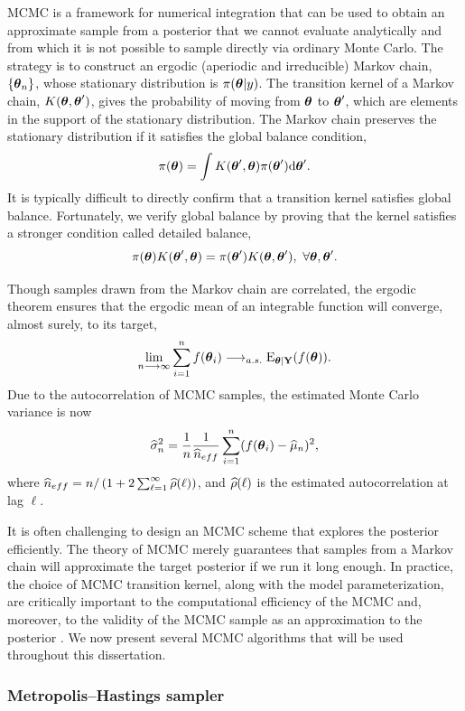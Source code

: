 MCMC is a framework for numerical integration that can be used to obtain an approximate sample from a posterior that we cannot evaluate analytically and from which it is not possible to sample directly via ordinary Monte Carlo. The strategy is to construct an ergodic (aperiodic and irreducible) Markov chain, $ \lbrace \boldsymbol{\theta}_n\rbrace $, whose stationary distribution is $ \pi(\boldsymbol{\theta}|y) $. The transition kernel of a Markov chain, $ K(\boldsymbol{\theta},\boldsymbol{\theta}^\prime) $, gives the probability of moving from $ \boldsymbol{\theta} $ to $ \boldsymbol{\theta}^\prime $, which are elements in the support of the stationary distribution. The Markov chain preserves the stationary distribution if it satisfies the global balance condition,
$$\pi(\boldsymbol{\theta}) = \int K(\boldsymbol{\theta}^\prime,\boldsymbol{\theta})\pi(\boldsymbol{\theta}^\prime)\mathrm{d} \boldsymbol{\theta}^\prime.$$
It is typically difficult to directly confirm that a transition kernel satisfies global balance. Fortunately, we verify global balance by proving that the kernel satisfies a stronger condition called detailed balance,
$$\pi(\boldsymbol{\theta})K(\boldsymbol{\theta}^\prime,\boldsymbol{\theta}) = \pi(\boldsymbol{\theta}^\prime)K(\boldsymbol{\theta},\boldsymbol{\theta}^\prime),\ \forall \boldsymbol{\theta},\boldsymbol{\theta}^\prime.$$

Though samples drawn from the Markov chain are correlated, the ergodic theorem ensures that the ergodic mean of an integrable function will converge, almost surely, to its target, 
$$\lim\limits_{n\longrightarrow\infty}\sum_{i=1}^nf(\boldsymbol{\theta}_i) \longrightarrow_{a.s.} \mathrm{E}_{\boldsymbol{\theta}|\mathbf{Y}}(f(\boldsymbol{\theta})).$$
Due to the autocorrelation of MCMC samples, the estimated Monte Carlo variance is now 
$$\widehat{\sigma}_n^2 = \frac{1}{n}\frac{1}{\widehat{n}_{eff}}\sum_{i=1}^n(f(\boldsymbol{\theta}_i) - \widehat{\mu}_n)^2,$$
where $ \widehat{n}_{eff} = n / \left (1 + 2\sum_{\ell=1}^{\infty}\widehat{\rho}(\ell)\right ) $, and $ \widehat{\rho}(\ell) $ is the estimated autocorrelation at lag $ \ell $. 

It is often challenging to design an MCMC scheme that explores the posterior efficiently. The theory of MCMC merely guarantees that samples from a Markov chain will approximate the target posterior if we run it long enough. In practice, the choice of MCMC transition kernel, along with the model parameterization, are critically important to the computational efficiency of the MCMC and, moreover, to the validity of the MCMC sample as an approximation to the posterior \cite{betancourt2017conceptual}. We now present several MCMC algorithms that will be used throughout this dissertation. 

\subsubsection{Metropolis--Hastings sampler}
\label{subsubsec:metropolis_hastings}

